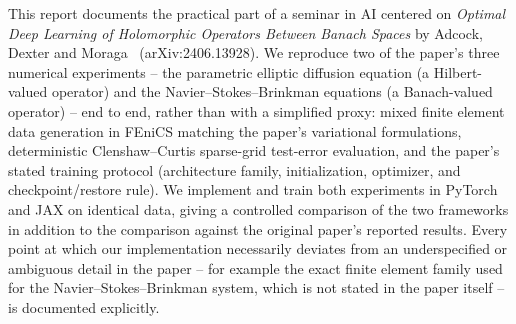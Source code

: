 
\cleardoubleoddpage%
\begin{abstract*}
This report documents the practical part of a seminar in AI centered on
\emph{Optimal Deep Learning of Holomorphic Operators Between Banach
Spaces} by Adcock, Dexter and Moraga~\cite{adcock2024holomorphic}
(arXiv:2406.13928). We reproduce two of the paper's three numerical
experiments -- the parametric elliptic diffusion equation (a
Hilbert-valued operator) and the Navier--Stokes--Brinkman equations (a
Banach-valued operator) -- end to end, rather than with a simplified
proxy: mixed finite element data generation in FEniCS matching the
paper's variational formulations, deterministic Clenshaw--Curtis
sparse-grid test-error evaluation, and the paper's stated training
protocol (architecture family, initialization, optimizer, and
checkpoint/restore rule). We implement and train both experiments in
PyTorch and JAX on identical data, giving a controlled comparison of the
two frameworks in addition to the comparison against the original
paper's reported results. Every point at which our implementation
necessarily deviates from an underspecified or ambiguous detail in the
paper -- for example the exact finite element family used for the
Navier--Stokes--Brinkman system, which is not stated in the paper itself
-- is documented explicitly.
\end{abstract*}




